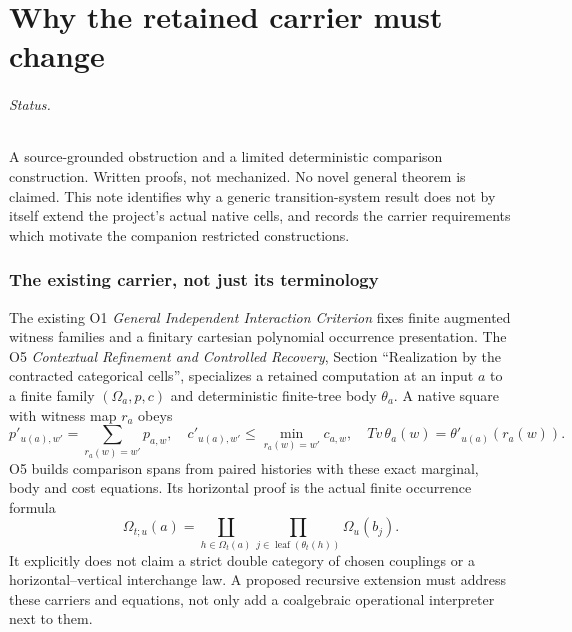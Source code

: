 \documentclass[11pt]{article}
\begin{document}
\part{Why the retained carrier must change}

\paragraph{Status.} A source-grounded obstruction and a limited deterministic comparison construction. Written proofs, not mechanized. No novel general theorem is claimed. This note identifies why a generic transition-system result does not by itself extend the project's actual native cells, and records the carrier requirements which motivate the companion restricted constructions.

\section{The existing carrier, not just its terminology}
The existing O1 \emph{General Independent Interaction Criterion} fixes finite augmented witness families and a finitary cartesian polynomial occurrence presentation. The O5 \emph{Contextual Refinement and Controlled Recovery}, Section ``Realization by the contracted categorical cells'', specializes a retained computation at an input $a$ to a finite family $(\Omega_a,p,c)$ and deterministic finite-tree body $\theta_a$. A native square with witness map $r_a$ obeys
\[
 p'_{u(a),w'}=\sum_{r_a(w)=w'}p_{a,w},\quad
 c'_{u(a),w'}\le\min_{r_a(w)=w'}c_{a,w},\quad
 Tv\,\theta_a(w)=\theta'_{u(a)}(r_a(w)).
\]
O5 builds comparison spans from paired histories with these exact marginal, body and cost equations. Its horizontal proof is the actual finite occurrence formula
\[
 \Omega_{t;u}(a)=\coprod_{h\in\Omega_t(a)}
       \prod_{j\in\operatorname{leaf}(\theta_t(h))}\Omega_u(b_j).
\]
It explicitly does not claim a strict double category of chosen couplings or a horizontal--vertical interchange law. A proposed recursive extension must address these carriers and equations, not only add a coalgebraic operational interpreter next to them.
\end{document}
